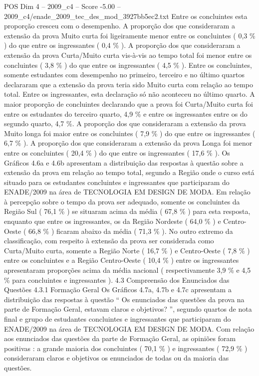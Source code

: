 \begin{textsample}{POS Dim 4 – 2009\_c4 – Score -5.00 – 2009\_c4/enade\_2009\_tec\_des\_mod\_3927bb5ec2.txt}
Entre os concluintes esta proporção cresceu com o desempenho.
A proporção dos que consideraram a extensão da prova Muito curta foi ligeiramente menor entre os concluintes ( 0,3 \% ) do que entre os ingressantes ( 0,4 \% ).
A proporção dos que consideraram a extensão da prova Curta/Muito curta vis-à-vis ao tempo total foi menor entre os concluintes ( 3,8 \% ) do que entre os ingressantes ( 4,5 \% ).
Entre os concluintes, somente estudantes com desempenho no primeiro, terceiro e no último quartos declararam que a extensão da prova teria sido Muito curta com relação ao tempo total.
Entre os ingressantes, esta declaração só não aconteceu no último quarto.
A maior proporção de concluintes declarando que a prova foi Curta/Muito curta foi entre os estudantes do terceiro quarto, 4,9 \% e entre os ingressantes entre os do segundo quarto, 4,7 \%.
A proporção dos que consideraram a extensão da prova Muito longa foi maior entre os concluintes ( 7,9 \% ) do que entre os ingressantes ( 6,7 \% ).
A proporção dos que consideraram a extensão da prova Longa foi menor entre os concluintes ( 20,4 \% ) do que entre os ingressantes ( 17,6 \% ).
Os Gráficos 4.6a e 4.6b apresentam a distribuição das respostas à questão sobre a extensão da prova em relação ao tempo total, segundo a Região onde o curso está situado para os estudantes concluintes e ingressantes que participaram do ENADE/2009 na área de TECNOLOGIA EM DESIGN DE MODA.
Em relação à percepção sobre o tempo da prova ser adequado, somente os concluintes da Região Sul ( 76,1 \% ) se situaram acima da média ( 67,8 \% ) para esta resposta, enquanto que entre os ingressantes, os da Região Nordeste ( 64,0 \% ) e Centro-Oeste ( 66,8 \% ) ficaram abaixo da média ( 71,3 \% ).
No outro extremo da classificação, com respeito à extensão da prova ser considerada como Curta/Muito curta, somente a Região Norte ( 16,7 \% ) e Centro-Oeste ( 7,8 \% ) entre os concluintes e a Região Centro-Oeste ( 10,4 \% ) entre os ingressantes apresentaram proporções acima da média nacional ( respectivamente 3,9 \% e 4,5 \% para concluintes e ingressantes ). 4.3 Compreensão dos Enunciados das Questões 4.3.1 Formação Geral Os Gráficos 4.7a, 4.7b e 4.7c apresentam a distribuição das respostas à questão “ Os enunciados das questões da prova na parte de Formação Geral, estavam claros e objetivos? ”, segundo quartos de nota final e grupo de estudantes concluintes e ingressantes que participaram do ENADE/2009 na área de TECNOLOGIA EM DESIGN DE MODA.
Com relação aos enunciados das questões da parte de Formação Geral, as opiniões foram positivas : a grande maioria dos concluintes ( 70,1 \% ) e ingressantes ( 72,9 \% ) consideraram claros e objetivos os enunciados de todas ou da maioria das questões.

\end{textsample}
